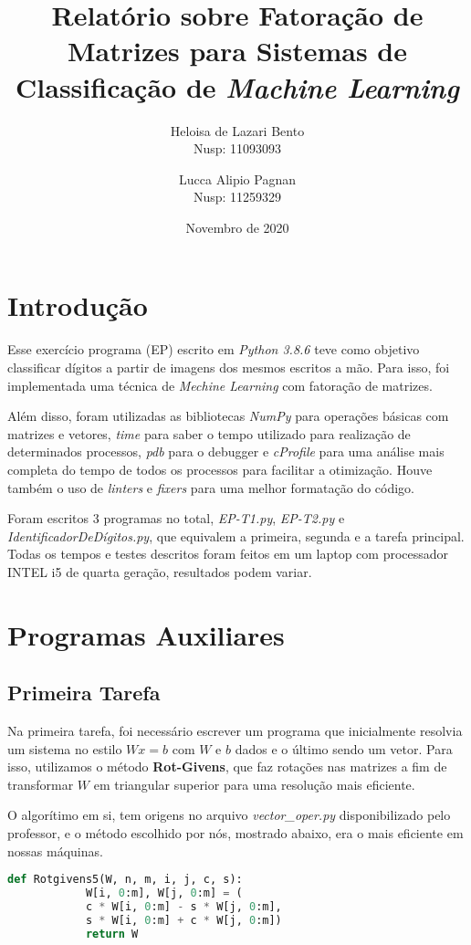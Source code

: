 \documentclass[a4paper, 12pt]{article}
\title{Relatório sobre Fatoração de Matrizes para Sistemas de Classificação de \textit{Machine Learning}}
\author{Heloisa de Lazari Bento \\ Nusp: 11093093 \and Lucca Alipio Pagnan \\ Nusp: 11259329}
\date{Novembro de 2020}
\begin{document}
\maketitle

\section{Introdução}

    Esse exercício programa (EP) escrito em \textit{Python 3.8.6} teve como objetivo classificar dígitos a partir de imagens dos mesmos escritos a mão.
    Para isso, foi implementada uma técnica de \textit{Mechine Learning} com fatoração de matrizes.

    Além disso, foram utilizadas as bibliotecas \textit{NumPy} para operações básicas com matrizes e vetores, \textit{time} para saber o tempo utilizado para realização de determinados processos, \textit{pdb} para o debugger e \textit{cProfile} para uma análise mais completa do tempo de todos os processos para facilitar a otimização.
    Houve também o uso de \textit{linters} e \textit{fixers} para uma melhor formatação do código.

    Foram escritos 3 programas no total, \textit{EP-T1.py}, \textit{EP-T2.py} e \textit{IdentificadorDeDígitos.py}, que equivalem a primeira, segunda e a tarefa principal.
    Todas os tempos e testes descritos foram feitos em um laptop com processador INTEL i5 de quarta geração, resultados podem variar.

\section{Programas Auxiliares}

\subsection{Primeira Tarefa}

    Na primeira tarefa, foi necessário escrever um programa que inicialmente resolvia um sistema no estilo  $Wx = b$ com  $W$ e $b$ dados e o último sendo um vetor.
    Para isso, utilizamos o método \textbf{Rot-Givens}, que faz rotações nas matrizes a fim de transformar $W$ em triangular superior para uma resolução mais eficiente.

    O algorítimo em si, tem origens no arquivo \textit{vector\_oper.py} disponibilizado pelo professor, e o método escolhido por nós, mostrado abaixo, era o mais eficiente em nossas máquinas.
    \begin{lstlisting}[language=Python]
        def Rotgivens5(W, n, m, i, j, c, s):
            W[i, 0:m], W[j, 0:m] = (
            c * W[i, 0:m] - s * W[j, 0:m],
            s * W[i, 0:m] + c * W[j, 0:m])
            return W
    \end{lstlisting}
\end{document}
